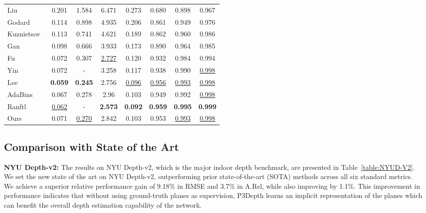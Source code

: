 \documentclass[final]{cvpr}
\begin{document}
\begin{table}[!t]
{\begin{tabular}{l|cccc|ccc}
			Liu \etal~\cite{depth:convolutional:neural:fields} & 0.201 & 1.584 & 6.471 & 0.273 & 0.680 & 0.898 & 0.967 \\
			Godard \etal~\cite{monodepth} & 0.114 & 0.898 & 4.935 & 0.206 & 0.861 & 0.949 & 0.976 \\
			Kuznietsov~\cite{semi:supervised:learning:monocular:depth}        & 0.113 & 0.741 & 4.621 & 0.189 & 0.862 & 0.960 & 0.986 \\
			Gan \etal~\cite{depth:pooling:eccv:2018}                 & 0.098 & 0.666 & 3.933 & 0.173 & 0.890 & 0.964 & 0.985 \\
			Fu \etal~\cite{depth:ordinal:cvpr:2018}           & 0.072 & 0.307 & \underline{2.727} & 0.120 & 0.932 & 0.984 & 0.994 \\ 
			Yin \etal~\cite{virtual:normal:depth}             & 0.072 &   -   & 3.258 & 0.117 & 0.938 & 0.990 & \underline{0.998} \\
			Lee \etal~\cite{local:planar:guidance}             & \textbf{0.059} & \textbf{0.245} & 2.756 & \underline{0.096} & \underline{0.956} & \underline{0.993} & \underline{0.998} \\ 
			AdaBins~\cite{adabins} & 0.067 & 0.278 & 2.96 & 0.103 & 0.949 & 0.992 & \underline{0.998} \\
			Ranftl \etal~\cite{vision:transformers:depth:iccv:2021} & \underline{0.062} & - & \textbf{2.573} & \textbf{0.092} & \textbf{0.959} & \textbf{0.995} & \textbf{0.999} \\
			\hline \hline 
             Ours   & 0.071 & \underline{0.270} & 2.842 & 0.103 & 0.953 & \underline{0.993} & \underline{0.998} \\
			\toprule[1pt]
		\end{tabular} }
	\vspace{-0.7cm}
\end{table}


\subsection{Comparison with State of the Art}

\textbf{NYU Depth-v2:}
The results on NYU Depth-v2, which is the major indoor depth benchmark, are presented in Table~\ref{table:NYUD-V2}. We set the new state of the art on NYU Depth-v2, outperforming prior state-of-the-art (SOTA) methods across all six standard metrics. We achieve a superior relative performance gain of 9.18\% in RMSE and 3.7\% in A.Rel, while also improving  by 1.1\%. This improvement in performance indicates that without using ground-truth planes as supervision, P3Depth learns an implicit representation of the planes which can benefit the overall depth estimation capability of the network.
\end{document}
